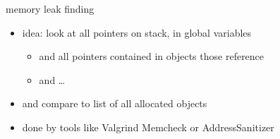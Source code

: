\begin{frame}{memory leak finding}
    \begin{itemize}
    \item idea: look at all pointers on stack, in global variables
    \begin{itemize}
        \item and all pointers contained in objects those reference
        \item and \ldots
    \end{itemize}
    \item and compare to list of all allocated objects
    \vspace{.5cm}
    \item done by tools like Valgrind Memcheck or AddressSanitizer
    \end{itemize}
\end{frame}
